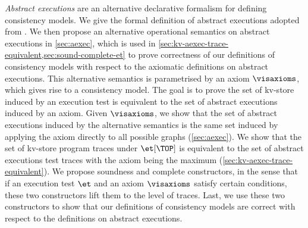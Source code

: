 \emph{Abstract executions} \citep{ev_transactions,framework-concur} 
are an alternative declarative formalism for defining consistency models. 
We give the formal definition of abstract executions adopted from \citep{framework-concur}.
We then propose an alternative operational semantics on abstract executions in \cref{sec:aexec},
which is used in \cref{sec:kv-aexec-trace-equivalent,sec:sound-complete-et}
to prove correctness of our definitions of consistency models
with respect to the axiomatic definitions on abstract executions.
This alternative semantics is parametrised by an axiom \( \visaxioms \), which gives rise to a consistency model.
The goal is to prove the set of kv-store induced by an execution test
is equivalent to the set of abstract executions induced by an axiom.
Given \( \visaxioms \),
we show that the set of abstract executions induced by the alternative semantics
is the same set induced by applying the axiom directly to all possible graphs (\cref{sec:aexec}).
We show that the set of kv-store program traces under \( \et[\TOP] \)
is equivalent to the set of abstract executions test traces 
with the axiom being the maximum (\cref{sec:kv-aexec-trace-equivalent}).
We propose soundness and complete constructors,
in the sense that if an execution test \( \et \) and an axiom \( \visaxioms \) satisfy certain conditions,
these two constructors lift them to the level of traces.
Last, we use these two constructors to show that our definitions of consistency models are correct 
with respect to the definitions on abstract executions.
